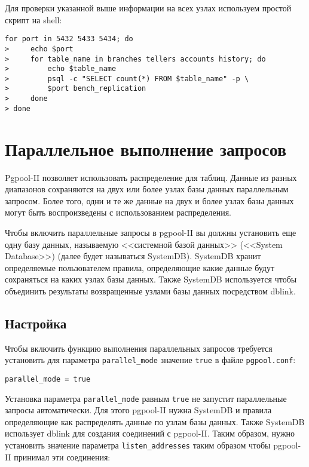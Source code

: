 Для проверки указанной выше информации на всех узлах используем простой скрипт на shell:

\begin{lstlisting}[label=lst:pgpool21,caption=Проверка репликации]
for port in 5432 5433 5434; do
>     echo $port
>     for table_name in branches tellers accounts history; do
>         echo $table_name
>         psql -c "SELECT count(*) FROM $table_name" -p \
>         $port bench_replication
>     done
> done
\end{lstlisting}





\section{Параллельное выполнение запросов}

Pgpool-II позволяет использовать распределение для таблиц. Данные из разных диапазонов сохраняются на двух или более узлах базы данных параллельным запросом. Более того, одни и те же данные на двух и более узлах базы данных могут быть воспроизведены с использованием распределения.

Чтобы включить параллельные запросы в pgpool-II вы должны установить еще одну базу данных, называемую <<системной базой данных>> (<<System Database>>) (далее будет называться SystemDB). SystemDB хранит определяемые пользователем правила, определяющие какие данные будут сохраняться на каких узлах базы данных. Также SystemDB используется чтобы объединить результаты возвращенные узлами базы данных посредством dblink.

\subsection{Настройка}

Чтобы включить функцию выполнения параллельных запросов требуется установить для параметра \lstinline!parallel_mode! значение \lstinline!true! в файле \lstinline!pgpool.conf!:

\begin{lstlisting}[label=lst:pgpool22,caption=Настройка параллельного запроса]
parallel_mode = true
\end{lstlisting}

Установка параметра \lstinline!parallel_mode! равным \lstinline!true! не запустит параллельные запросы автоматически. Для этого pgpool-II нужна SystemDB и правила определяющие как распределять данные по узлам базы данных. Также SystemDB использует dblink для создания соединений с pgpool-II. Таким образом, нужно установить значение параметра \lstinline!listen_addresses! таким образом чтобы pgpool-II принимал эти соединения:

